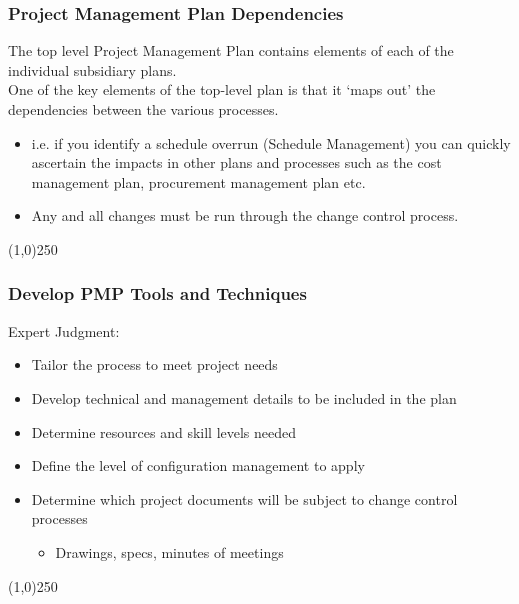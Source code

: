 \begin{frame}
\frametitle{Project Management Plan \hfill Dependencies}
The top level Project Management Plan contains elements of each of the individual subsidiary plans.\\
One of the key elements of the top-level plan is that it `maps out' the dependencies between the various processes.\\
\begin{itemize}
	\item i.e. if you identify a schedule overrun (Schedule Management) you can quickly ascertain the impacts in other plans and processes such as the cost management plan, procurement management plan etc.
	\item Any and all changes must be run through the change control process.
\end{itemize}
\end{frame}\begin{center}\line(1,0){250}\end{center}
%
%
\begin{frame}
\frametitle{Develop PMP \hfill Tools and Techniques}
Expert Judgment:
\begin{itemize}
	\item Tailor the process to meet project needs
	\item Develop technical and management details to be included in the plan
	\item Determine resources and skill levels needed
	\item Define the level of configuration management to apply
	\item Determine which project documents will be subject to change control processes
		\begin{itemize}
			\item Drawings, specs, minutes of meetings
		\end{itemize}
\end{itemize}
\end{frame}\begin{center}\line(1,0){250}\end{center}
%
%



